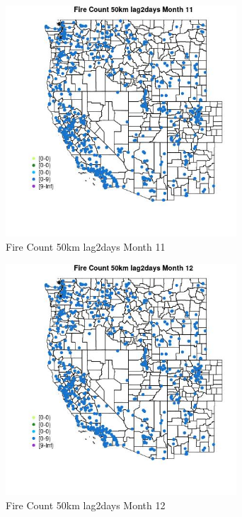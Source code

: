 \begin{figure} 
\centering  
\includegraphics[width=0.77\textwidth]{Code_Outputs/Report_ML_input_PM25_Step4_part_e_de_duplicated_aves_compiled_2019-05-21wNAs_MapObsMo11Fire_Count_50km_lag2days.jpg} 
\caption{\label{fig:Report_ML_input_PM25_Step4_part_e_de_duplicated_aves_compiled_2019-05-21wNAsMapObsMo11Fire_Count_50km_lag2days}Fire Count 50km lag2days Month 11} 
\end{figure} 
 

\begin{figure} 
\centering  
\includegraphics[width=0.77\textwidth]{Code_Outputs/Report_ML_input_PM25_Step4_part_e_de_duplicated_aves_compiled_2019-05-21wNAs_MapObsMo12Fire_Count_50km_lag2days.jpg} 
\caption{\label{fig:Report_ML_input_PM25_Step4_part_e_de_duplicated_aves_compiled_2019-05-21wNAsMapObsMo12Fire_Count_50km_lag2days}Fire Count 50km lag2days Month 12} 
\end{figure} 
 

